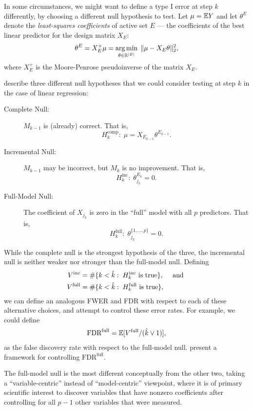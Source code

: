 \documentclass{article}
\begin{document}
In some circumstances, we might want to define a type I error at step $k$ differently, by choosing a different null hypothesis to test. Let $\mu = \mathbb{E} Y$ and let $\theta^E$ denote the {\em least-squares coefficients} of active set $E$ --- the coefficients of the best linear predictor for the design matrix $X_E$:
\[
\theta^E = X_E^+ \mu = \operatorname*{arg\,min}_{\theta\in \mathbb{R}^{|E|}} \; \|\mu - X_E\theta\|_2^2,
\]
where $X_E^+$ is the Moore-Penrose pseudoinverse of the matrix $X_E$. 

\citet{gsell2013sequential} describe three different null hypotheses that we could consider testing at step $k$ in the case of linear regression:
\begin{description}
\item[Complete Null:] $M_{k-1}$ is (already) correct. That is, 
\[
H_k^{\text{comp}}:\;\mu = X_{E_{k-1}} \theta^{E_{k-1}}.
\]
\item[Incremental Null:] $M_{k-1}$ may be incorrect, but $M_k$ is no improvement. That is, 
\[
H_k^{\text{inc}}:\; \theta_{j_k}^{E_k} = 0.
\]
\item[Full-Model Null:] The coefficient of $X_{j_k}$ is zero in the ``full'' model with all $p$ predictors. That is,
\[
H_k^{\text{full}}:\; \theta_{j_k}^{\{1,\ldots,p\}} = 0.
\]
\end{description}

While the complete null is the strongest hypothesis of the three, the incremental null is neither weaker nor stronger than the full-model null. Defining 
\begin{align*}
V^{\text{inc}} &= \#\{k < \hat{k}:\; H_k^{\text{inc}} \text{ is true}\}, \quad \text{ and } \\
V^{\text{full}} &= \#\{k < \hat{k}:\; H_k^{\text{full}} \text{ is true}\},
\end{align*}
we can define an analogous FWER and FDR with respect to each of these alternative choices, and attempt to control these error rates. For example, we could define
\[
\text{FDR}^{\text{full}} = \mathbb{E}[V^{\text{full}} / (\hat{k} \vee 1)],
\]
as the false discovery rate with respect to the full-model null. \citet{barber2014controlling} present a framework for controlling $\text{FDR}^{\text{full}}$. 

The full-model null is the most different conceptually from the other two, taking a ``variable-centric'' instead of ``model-centric'' viewpoint, where it is of primary scientific interest to discover variables that have nonzero coefficients after controlling for all $p-1$ other variables that were measured.
\end{document}
